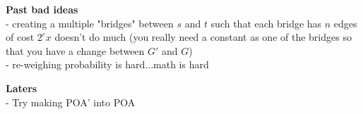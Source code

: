 \documentclass[11pt]{article}
\begin{document}
\textbf{Past bad ideas} \\
- creating a multiple "bridges" between $s$ and $t$ such that each bridge has
$n$ edges of cost $2^cx$ doesn't do much (you really need a constant as one of
the bridges so that you have a change between $G'$ and $G$) \\
- re-weighing probability is hard...math is hard

\textbf{Laters} \\
- Try making POA' into POA


\nocite{Awerbuch2005}
\nocite{Christodoulou2005}
\nocite{Rieger2008}

\printbibliography
\end{document}
